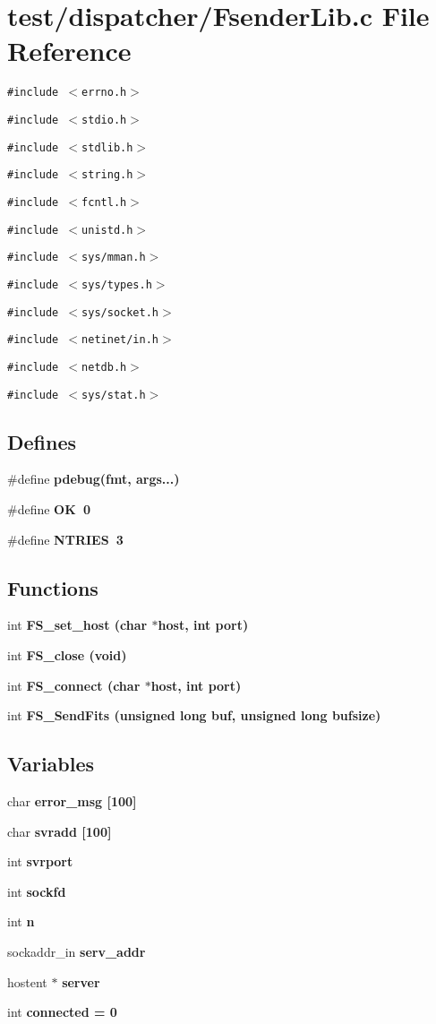 \section{test/dispatcher/Fsender\-Lib.c File Reference}
\label{FsenderLib_8c}
{\tt \#include $<$errno.h$>$}\par
{\tt \#include $<$stdio.h$>$}\par
{\tt \#include $<$stdlib.h$>$}\par
{\tt \#include $<$string.h$>$}\par
{\tt \#include $<$fcntl.h$>$}\par
{\tt \#include $<$unistd.h$>$}\par
{\tt \#include $<$sys/mman.h$>$}\par
{\tt \#include $<$sys/types.h$>$}\par
{\tt \#include $<$sys/socket.h$>$}\par
{\tt \#include $<$netinet/in.h$>$}\par
{\tt \#include $<$netdb.h$>$}\par
{\tt \#include $<$sys/stat.h$>$}\par
\subsection*{Defines}
\begin{CompactItemize}
\item 
\#define \bf{pdebug}(fmt, args...)
\item 
\#define \bf{OK}~0
\item 
\#define \bf{NTRIES}~3
\end{CompactItemize}
\subsection*{Functions}
\begin{CompactItemize}
\item 
int \bf{FS\_\-set\_\-host} (char $\ast$host, int port)
\item 
int \bf{FS\_\-close} (void)
\item 
int \bf{FS\_\-connect} (char $\ast$host, int port)
\item 
int \bf{FS\_\-Send\-Fits} (unsigned long buf, unsigned long bufsize)
\end{CompactItemize}
\subsection*{Variables}
\begin{CompactItemize}
\item 
char \bf{error\_\-msg} [100]
\item 
char \bf{svradd} [100]
\item 
int \bf{svrport}
\item 
int \bf{sockfd}
\item 
int \bf{n}
\item 
sockaddr\_\-in \bf{serv\_\-addr}
\item 
hostent $\ast$ \bf{server}
\item 
int \bf{connected} = 0
\end{CompactItemize}


